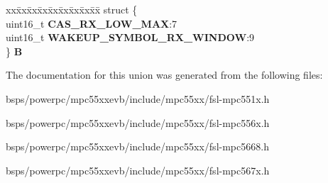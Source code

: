 \begin{DoxyCompactItemize}
\begin{tabbing}
\end{tabbing}\item 
\mbox{\label{unionuPCR4_a2d62785eb8dc4ba846aa7084cc7e4226}} 
\begin{tabbing}
xx\=xx\=xx\=xx\=xx\=xx\=xx\=xx\=xx\=\kill
struct \{\\
\>uint16\_t {\bfseries CAS\_RX\_LOW\_MAX}:7\\
\>uint16\_t {\bfseries WAKEUP\_SYMBOL\_RX\_WINDOW}:9\\
\} {\bfseries B}\\

\end{tabbing}\end{DoxyCompactItemize}


The documentation for this union was generated from the following files\+:\begin{DoxyCompactItemize}
\item 
bsps/powerpc/mpc55xxevb/include/mpc55xx/fsl-\/mpc551x.\+h\item 
bsps/powerpc/mpc55xxevb/include/mpc55xx/fsl-\/mpc556x.\+h\item 
bsps/powerpc/mpc55xxevb/include/mpc55xx/fsl-\/mpc5668.\+h\item 
bsps/powerpc/mpc55xxevb/include/mpc55xx/fsl-\/mpc567x.\+h\end{DoxyCompactItemize}
